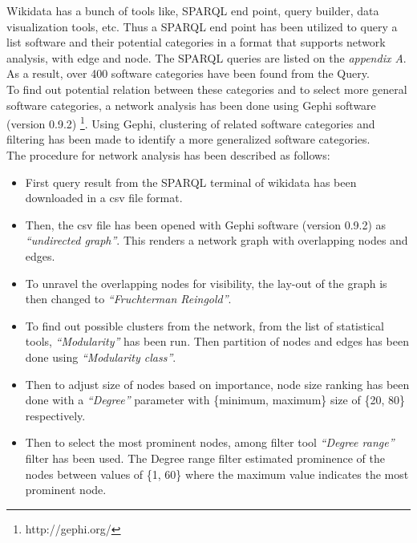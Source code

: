 Wikidata has a bunch of tools like, SPARQL end point, query builder, data visualization tools, etc. Thus a SPARQL end point has been utilized  to query a list software and their potential categories in a format that supports network analysis, with edge and node. The SPARQL queries are listed on the \emph{appendix A}. As a result, over 400 software categories have been found from the Query. \\

To find out potential relation between these categories and to select more general software categories, a network analysis has been done using Gephi software (version 0.9.2) \footnote{http://gephi.org/}. Using Gephi, clustering of related software categories and filtering has been made to identify a more generalized software categories. \\

\noindent The procedure for network analysis has been described as follows:

\begin{itemize}
	\itemsep1em
	\item First query result from the SPARQL terminal of wikidata has been downloaded in a csv file format. 
	\item Then, the csv file has been opened with Gephi software (version 0.9.2) as \emph{“undirected graph”}. This renders a network graph with overlapping nodes and edges. 
	\item To unravel the overlapping nodes for visibility, the lay-out of the graph is then changed to \emph{“Fruchterman Reingold”}. 
	\item To find out possible clusters from the network, from the list of statistical tools, \emph{“Modularity”} has been run. Then partition of nodes and edges has been done using \emph{“Modularity class”}. 
	\item Then to adjust size of nodes based on importance, node size ranking has been done with a \emph{“Degree”} parameter with \{minimum, maximum\} size of  \{20, 80\} respectively. 
	\item Then to select the most prominent nodes, among filter tool \emph{“Degree range”} filter has been used. The Degree range filter estimated prominence of the nodes between values of \{1, 60\} where the maximum value indicates the most prominent node. 
\end{itemize}

